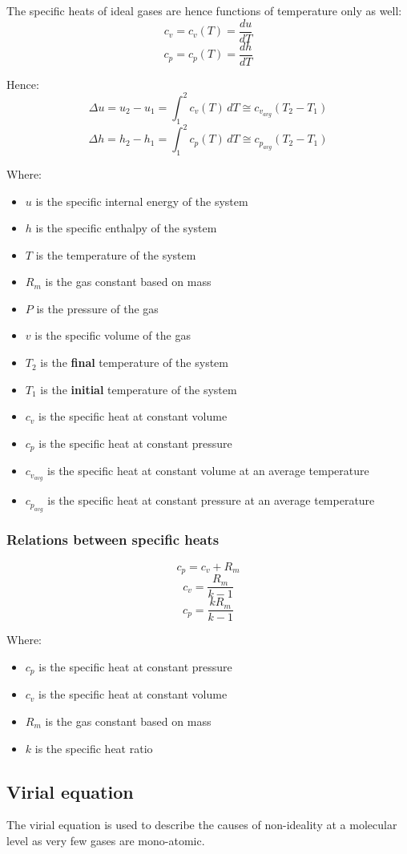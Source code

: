 \documentclass[11pt]{article}
\begin{document}
The specific heats of ideal gases are hence functions of temperature only as well:
\[c_v = c_v(T) = \frac{du}{dT}\]
\[c_p = c_p(T) = \frac{dh}{dT}\]

Hence:
\[\Delta u = u_2 - u_1 = \int_1^2 c_v(T) \, dT \cong c_{v_{avg}} \left(T_2 - T_1 \right)\]
\[\Delta h = h_2 - h_1 = \int_1^2 c_p(T) \, dT \cong c_{p_{avg}} \left(T_2 - T_1 \right)\]

Where:
\begin{itemize}
\item \(u\) is the specific internal energy of the system
\item \(h\) is the specific enthalpy of the system
\item \(T\) is the temperature of the system
\item \(R_m\) is the gas constant based on mass
\item \(P\) is the pressure of the gas
\item \(v\) is the specific volume of the gas
\item \(T_2\) is the \textbf{final} temperature of the system
\item \(T_1\) is the \textbf{initial} temperature of the system
\item \(c_v\) is the specific heat at constant volume
\item \(c_p\) is the specific heat at constant pressure
\item \(c_{v_{avg}}\) is the specific heat at constant volume at an average temperature
\item \(c_{p_{avg}}\) is the specific heat at constant pressure at an average temperature
\end{itemize}
\subsubsection{Relations between specific heats}
\label{sec:org045b005}
\[c_p = c_v + R_m\]
\[c_v = \frac{R_m}{k - 1}\]
\[c_p = \frac{kR_m}{k - 1}\]

Where:
\begin{itemize}
\item \(c_p\) is the specific heat at constant pressure
\item \(c_v\) is the specific heat at constant volume
\item \(R_m\) is the gas constant based on mass
\item \(k\) is the specific heat ratio
\end{itemize}
\subsection{Virial equation}
\label{sec:org36689d5}
The virial equation is used to describe the causes of non-ideality at a molecular level as very few gases are mono-atomic.
\end{document}
